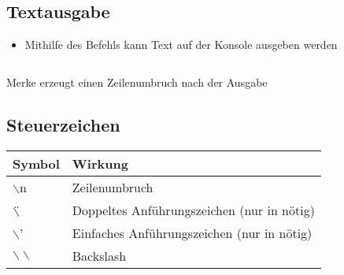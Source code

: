 \subsection{Textausgabe}
\begin{frame}
    \slidehead
    \begin{itemize}
        \item Mithilfe des Befehls  kann Text auf der Konsole ausgeben werden
    \end{itemize}
    \pause
    \begin{columns}
        \begin{column}{6cm}
        \end{column}
        \begin{column}{7cm}
        \end{column}
    \end{columns}
    \vspace{0.25cm}
    \begin{block}{Merke}
         erzeugt einen Zeilenumbruch nach der Ausgabe
    \end{block}
\end{frame}

\subsection{Steuerzeichen}
\begin{frame}
    \slidehead

    \begin{table}[htbp]
        \begin{tabular}{|l|l|}
            \hline
            \textbf{Symbol}         & \textbf{Wirkung}                                               \\ \hline
            $\backslash$n           & Zeilenumbruch                                                  \\ \hline
            $\backslash$\"          & Doppeltes Anführungszeichen  (nur in \pythoninline{" "} nötig) \\ \hline
            $\backslash$'           & Einfaches Anführungszeichen (nur in \pythoninline{' '} nötig)  \\ \hline
            $\backslash \backslash$ & Backslash                                                      \\ \hline
        \end{tabular}
        \label{}
    \end{table}
    \pause
\end{frame}

